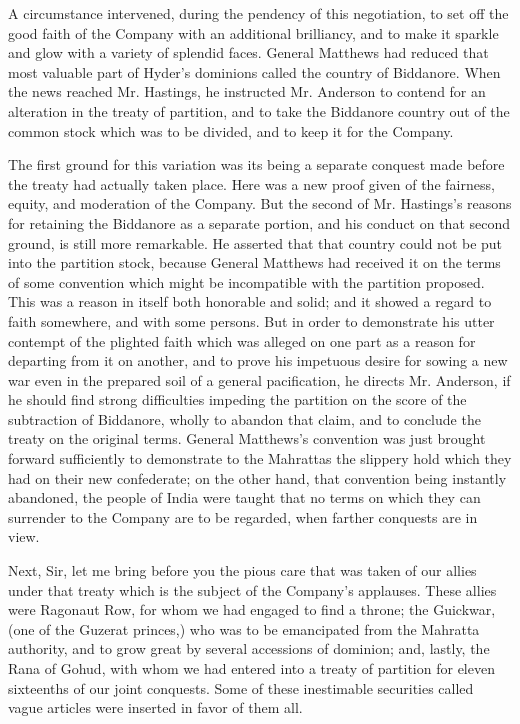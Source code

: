 A circumstance intervened, during the pendency of this negotiation, to set off the good faith of the Company with an additional brilliancy, and to make it sparkle and glow with a variety of splendid faces. General Matthews had reduced that most valuable part of Hyder's dominions called the country of Biddanore. When the news reached Mr. Hastings, he instructed Mr. Anderson to contend for an alteration in the treaty of partition, and to take the Biddanore country out of the common stock which was to be divided, and to keep it for the Company.

The first ground for this variation was its being a separate conquest made before the treaty had actually taken place. Here was a new proof given of the fairness, equity, and moderation of the Company. But the second of Mr. Hastings's reasons for retaining the Biddanore as a separate portion, and his conduct on that second ground, is still more remarkable. He asserted that that country could not be put into the partition stock, because General Matthews had received it on the terms of some convention which might be incompatible with the partition proposed. This was a reason in itself both honorable and solid; and it showed a regard to faith somewhere, and with some persons. But in order to demonstrate his utter contempt of the plighted faith which was alleged on one part as a reason for departing from it on another, and to prove his impetuous desire for sowing a new war even in the prepared soil of a general pacification, he directs Mr. Anderson, if he should find strong difficulties impeding the partition on the score of the subtraction of Biddanore, wholly to abandon that claim, and to conclude the treaty on the original terms. General Matthews's convention was just brought forward sufficiently to demonstrate to the Mahrattas the slippery hold which they had on their new confederate; on the other hand, that convention being instantly abandoned, the people of India were taught that no terms on which they can surrender to the Company are to be regarded, when farther conquests are in view.

Next, Sir, let me bring before you the pious care that was taken of our allies under that treaty which is the subject of the Company's applauses. These allies were Ragonaut Row, for whom we had engaged to find a throne; the Guickwar, (one of the Guzerat princes,) who was to be emancipated from the Mahratta authority, and to grow great by several accessions of dominion; and, lastly, the Rana of Gohud, with whom we had entered into a treaty of partition for eleven sixteenths of our joint conquests. Some of these inestimable securities called vague articles were inserted in favor of them all.

